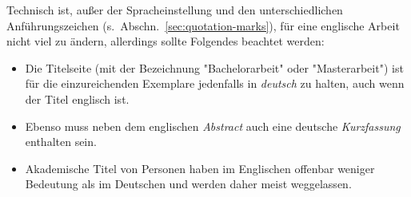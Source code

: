 Technisch ist, außer der Spracheinstellung und den unterschiedlichen
Anführungszeichen (s.\ Abschn.~\ref{sec:quotation-marks}), für eine
englische Arbeit nicht viel zu ändern, allerdings sollte Folgendes beachtet
werden:
%
\begin{itemize}
    \item Die Titelseite (mit der Bezeichnung "Bachelorarbeit" oder
    "Masterarbeit") ist für die einzureichenden Exemplare jedenfalls in
    \emph{deutsch} zu halten, auch wenn der Titel englisch ist.
    \item Ebenso muss neben dem englischen \emph{Abstract} auch eine deutsche
    \emph{Kurzfassung} enthalten sein. %
    \item Akademische Titel von Personen haben im Englischen offenbar
    weniger Bedeutung als im Deutschen und werden daher meist weggelassen.
\end{itemize}
